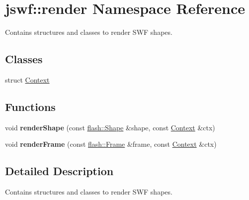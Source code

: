 \hypertarget{namespacejswf_1_1render}{\section{jswf\+:\+:render Namespace Reference}
\label{namespacejswf_1_1render}
}


Contains structures and classes to render S\+W\+F shapes.  


\subsection*{Classes}
\begin{DoxyCompactItemize}
\item 
struct \hyperlink{structjswf_1_1render_1_1_context}{Context}
\end{DoxyCompactItemize}
\subsection*{Functions}
\begin{DoxyCompactItemize}
\item 
\hypertarget{namespacejswf_1_1render_a471f4d7d90963bc103c96a59fc1c824f}{void {\bfseries render\+Shape} (const \hyperlink{classjswf_1_1flash_1_1_shape}{flash\+::\+Shape} \&shape, const \hyperlink{structjswf_1_1render_1_1_context}{Context} \&ctx)}\label{namespacejswf_1_1render_a471f4d7d90963bc103c96a59fc1c824f}

\item 
\hypertarget{namespacejswf_1_1render_a5e6e8c171a6a94f96482303d476b42cb}{void {\bfseries render\+Frame} (const \hyperlink{classjswf_1_1flash_1_1_frame}{flash\+::\+Frame} \&frame, const \hyperlink{structjswf_1_1render_1_1_context}{Context} \&ctx)}\label{namespacejswf_1_1render_a5e6e8c171a6a94f96482303d476b42cb}

\end{DoxyCompactItemize}


\subsection{Detailed Description}
Contains structures and classes to render S\+W\+F shapes. 